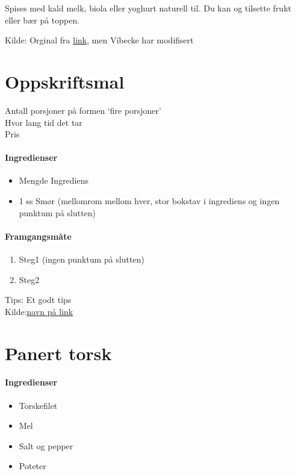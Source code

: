 \documentclass[12pt,a4paper]{book}
\begin{document}
Spises med kald melk, biola eller yoghurt naturell til. Du kan og tilsette frukt eller bær på toppen.

Kilde: Orginal fra \href{http://www.karolinegrovdal.no/?p=305}{link}, men Vibecke har modifisert
\clearpage{}
\clearpage{}\section{﻿Oppskriftsmal}
\label{oppskrifsmal}

Antall porsjoner på formen `fire porsjoner'\\
Hvor lang tid det tar\\
Pris

\paragraph{Ingredienser}
\begin{itemize}[noitemsep]
	\item Mengde Ingrediens
	\item 1 ss Smør (mellomrom mellom hver, stor bokstav i ingrediens og ingen punktum på slutten)
\end{itemize}

\paragraph{Framgangsmåte}
\begin{enumerate}[noitemsep]
	\item Steg1 (ingen punktum på slutten)
	\item Steg2
\end{enumerate}

Tips: Et godt tips \\

Kilde:\href{https://link}{navn på link}
\clearpage{}
\clearpage{}\section{﻿Panert torsk}


\paragraph{Ingredienser}
\begin{itemize}[noitemsep]
	\item Torskefilet
	\item Mel
	\item Salt og pepper
	\item Poteter
\end{itemize}
\end{document}
